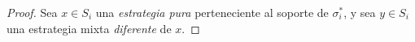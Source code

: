 \begin{proof}
%
Sea $x \in S_i$ una \emph{estrategia pura} perteneciente al soporte de $\sigma^*_i$, y sea $y \in S_i$ una estrategia mixta \emph{diferente} de $x$. 

\end{proof}
